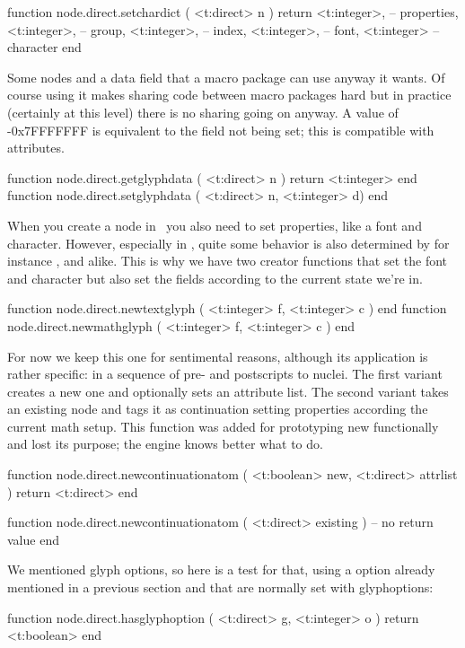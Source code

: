 \starttyping[option=LUA]
function node.direct.setchardict (
    <t:direct> n
)
    return
        <t:integer>, -- properties,
        <t:integer>, -- group,
        <t:integer>, -- index,
        <t:integer>, -- font,
        <t:integer>  -- character
end
\stoptyping

Some nodes and a data field that a macro package can use anyway it wants. Of
course using it makes sharing code between macro packages hard but in practice
(certainly at this level) there is no sharing going on anyway. A value of \type
{-0x7FFFFFFF} is equivalent to the field not being set; this is compatible with
attributes.

\starttyping[option=LUA]
function node.direct.getglyphdata ( <t:direct> n ) return <t:integer> end
function node.direct.setglyphdata ( <t:direct> n, <t:integer> d) end
\stoptyping

When you create a node in \LUA\ you also need to set properties, like a font
and character. However, especially in \CONTEXT, quite some behavior is also
determined by for instance ,  and alike.
This is why we have two creator functions that set the font and character but
also set the fields according to the current state we're in.

\starttyping[option=LUA]
function node.direct.newtextglyph ( <t:integer> f, <t:integer> c ) end
function node.direct.newmathglyph ( <t:integer> f, <t:integer> c ) end
\stoptyping

For now we keep this one for sentimental reasons, although its application is
rather specific: in a sequence of pre- and postscripts to nuclei. The first
variant creates a new one and optionally sets an attribute list. The second
variant takes an existing node and tags it as continuation setting properties
according the current math setup. This function was added for prototyping new
functionally and lost its purpose; the engine knows better what to do.

\starttyping[option=LUA]
function node.direct.newcontinuationatom (
    <t:boolean> new,
    <t:direct>  attrlist
)
    return <t:direct>
end

function node.direct.newcontinuationatom (
    <t:direct> existing
)
    -- no return value
end
\stoptyping

We mentioned glyph options, so here is a test for that, using a option already
mentioned in a previous section and that are normally set with \prm
{glyphoptions}:

\starttyping[option=LUA]
function node.direct.hasglyphoption ( <t:direct> g, <t:integer> o )
    return <t:boolean>
end
\stoptyping

